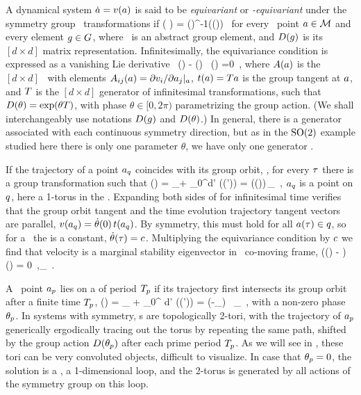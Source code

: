 \documentclass[aip,cha,
reprint,
secnumarabic,
nofootinbib, tightenlines,
nobibnotes, showkeys, showpacs,
superscriptaddress,
]{revtex4-1}
\begin{document}
A dynamical system $\dot{a}={v}(a)$ is said to be \emph{equivariant} 
or \emph{\Group-equivariant} under the symmetry group \Group\ transformations 
if
\beq
	\vel( \ssp )
    =  \matrixRep(\LieEl)^{-1}\vel(\matrixRep(\LieEl)\ssp)
	\,
for every \statesp\ point $a \in {\cal M}$ and every element $g \in
G$, where \LieEl\ is an abstract group element, and 
${D}(g)$ is its $[d\!\times\!d]$ matrix representation.
Infinitesimally, the equivariance condition  is expressed as
a vanishing Lie derivative
\beq
  \Lg \, \vel(\ssp)  - \Mvar(\ssp) \, \groupTan(\ssp) =0
  \,,
where
${A}(a)$ is the $[d\!\times\!d]$ \stabmat\, with elements
${A}_{ij}(a)={\partial {v}_i}/{\partial a_j}|_{a}$, $ t(a)
= {T} a $ is the group tangent at $a$, and ${T}$ is the
$[d\!\times\!d]$ generator of infinitesimal transformations, such that
${D}(\theta) = \exp(\theta{T})$, with phase $\theta \in [0,2\pi)$
parametrizing the group action. (We shall interchangeably use notations
${D}(g)$ and ${D}(\theta)$.) In general, there is a
generator associated with each continuous symmetry direction, but as in
the $\textrm{SO}(2)$ example studied here there is only one parameter $\theta$,
we have only one generator \Lg.

If the trajectory of a point $a_q$ coincides with its group
orbit, \ie, for every $\tau$ there is a group transformation such that
\beq
\ssp (\zeit)
    = \ssp_\stagn + \int_0^\zeit \!\!d\zeit' \vel(\ssp (\zeit'))
    = \matrixRep(\theta (\zeit))\,\ssp_\stagn
  \,,
$a_q$ is a point on \emph{\reqv} $q$, here a 1-torus in the
\statesp. Expanding both sides of  for infinitesimal time
verifies that the group orbit tangent and the time evolution trajectory
tangent vectors are parallel,
${v}(a_q) = \dot{\theta}(0) \, t(a_q)$.
By symmetry, this must hold for all $a(\tau) \in q$, so for a \reqv\
the \emph{\phaseVel} is a constant, $\dot{\theta}(\tau) = c$.
Multiplying the equivariance condition \refeq{inftmInv} by $c$ we
find that velocity is a marginal stability eigenvector in \reqv\
co-moving frame,
\beq
(\Mvar (\ssp) - \velRel \Lg) \vel (\ssp) = 0
\,,\qquad \ssp \in \pS_\stagn
\,.

A \statesp\ point $a_{p}$ lies on a \emph{\rpo} of period
${T_{p}}$ if its trajectory first intersects its group orbit after
a finite time ${T_{p}}$,
\beq
\ssp(\period{\rpprime})
    = \ssp_\rpprime
     + \int_0^\period{\rpprime} \!\!\!\!d\tau' \vel(\ssp (\tau'))
    = \matrixRep(-\theta_\rpprime) \,  \ssp_\rpprime
  \,,
with a non-zero phase $\theta_{p}$. In systems with 
symmetry, \rpo s are topologically 2-tori, with the trajectory of
$a_{p}$ generically ergodically tracing out the torus by
repeating the same path, shifted by the group action
${D}(\theta_{p})$ after each prime period
${T_{p}}$. As we will see in , these tori
can be very convoluted objects, difficult to visualize. In case that
$\theta_{p}=0$, the solution is a \po, a 1-dimensional loop, and
the 2-torus is generated by all actions of the symmetry group on this
loop.
\end{document}

